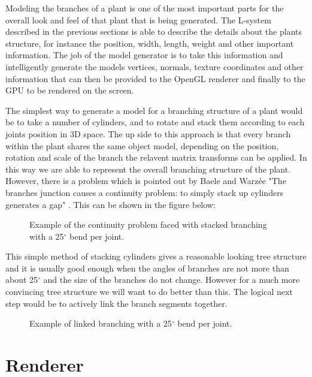 Modeling the branches of a plant is one of the most important parts for the overall look and feel of that plant that is being generated. The L-system described in the previous sections is able to describe the details about the plants structure, for instance the position, width, length, weight and other important information. The job of the model generator is to take this information and intelligently generate the models vertices, normals, texture coordinates and other information that can then be provided to the OpenGL renderer and finally to the GPU to be rendered on the screen.

The simplest way to generate a model for a branching structure of a plant would be to take a number of cylinders, and to rotate and stack them according to each joints position in 3D space. The up side to this approach is that every branch within the plant shares the same object model, depending on the position, rotation and scale of the branch the relavent matrix transforms can be applied. In this way we are able to represent the overall branching structure of the plant. However, there is a problem which is pointed out by Baele and Warz\'{e}e "The branches junction causes a continuity problem: to simply stack up cylinders generates a gap" \cite{baele2005real}. This can be shown in the figure below:

\FloatBarrier

\begin{figure}[htbp]
	{\centering
		\vspace{7px}
		\setlength{\fboxrule}{1pt}
		\caption{Example of the continuity problem faced with stacked branching with a 25$^{\circ}$ bend per joint.}
	}
\end{figure}

\FloatBarrier

This simple method of stacking cylinders gives a reasonable looking tree structure and it is usually good enough when the angles of branches are not more than about 25$^{\circ}$ and the size of the branches do not change. However for a much more convincing tree structure we will want to do better than this. The logical next step would be to actively link the branch segments together.

\begin{figure}[htbp]
	{\centering
		\vspace{7px}
		\setlength{\fboxrule}{1pt}
		\caption{Example of linked branching with a 25$^{\circ}$ bend per joint.}
	}
\end{figure}
\FloatBarrier

\section{Renderer}


